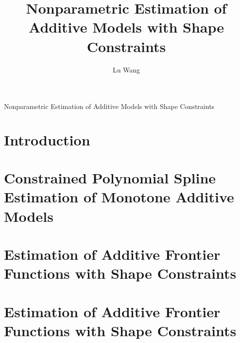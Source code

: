 \documentclass[double,12pt]{beavtex}
\title{Nonparametric Estimation of Additive Models with Shape Constraints}
\author{Lu Wang}
\begin{document}
\maketitle
\mainmatter
\begingroup
\let\clearpage\relax
\begin{center}
\large
Nonparametric Estimation of Additive Models with Shape Constraints
\normalsize
\end{center}

\chapter{Introduction}

\pagebreak

\chapter{Constrained Polynomial Spline Estimation of Monotone Additive Models}

\pagebreak

\chapter{Estimation of Additive Frontier Functions with Shape Constraints}

\pagebreak

\chapter{Estimation of Additive Frontier Functions with Shape Constraints}

\pagebreak

% 


% 



% 






\pagebreak

\appendixpage
\appendix

\pagebreak

%
\end{document}
